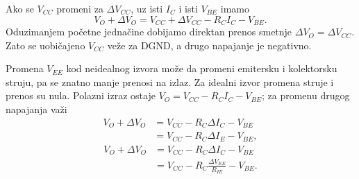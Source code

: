 Ako se $V_{CC}$ promeni za $\Delta V_{CC}$, uz isti $I_C$ i isti $V_{BE}$ imamo
\[V_O+\Delta V_O=V_{CC}+\Delta V_{CC}-R_CI_C-V_{BE}.\]
Oduzimanjem početne jednačine dobijamo direktan prenos smetnje $\Delta V_O=\Delta V_{CC}$. Zato se uobičajeno $V_{CC}$ veže za DGND, a drugo napajanje je negativno.

Promena $V_{EE}$ kod neidealnog izvora može da promeni emitersku i kolektorsku struju, pa se znatno manje prenosi na izlaz. Za idealni izvor promena struje i prenos su nula. Polazni izraz ostaje $V_O=V_{CC}-R_CI_C-V_{BE}$; za promenu drugog napajanja važi
\[\begin{aligned}V_O+\Delta V_O&=V_{CC}-R_C\Delta I_C-V_{BE}\\&=V_{CC}-R_C\Delta I_E-V_{BE},\end{aligned}\]
\[\begin{aligned}V_O+\Delta V_O&=V_{CC}-R_C\Delta I_C-V_{BE}\\&=V_{CC}-R_C\frac{\Delta V_{EE}}{R_{IE}}-V_{BE}.\end{aligned}\]
